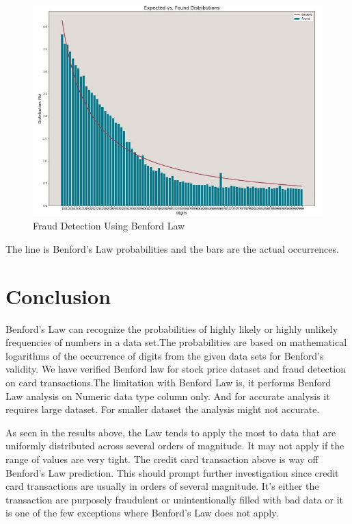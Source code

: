 \begin{figure}[!ht]
\centering\includegraphics[width=\columnwidth]{images/ben_card_trx.JPG}
  \caption{Fraud Detection Using Benford Law}\label{f:card-ds-benfordlaw}
\end{figure}

The line is Benford’s Law probabilities and the bars are 
the actual occurrences.


\section{Conclusion}
Benford’s Law can recognize the probabilities of highly  likely or 
highly unlikely frequencies of numbers in a data set.The 
probabilities are based on mathematical logarithms of the occurrence 
of digits from the given data sets for Benford's validity. We have 
verified Benford law for stock price dataset and fraud detection on 
card transactions.The limitation with Benford Law is, it performs 
Benford Law analysis on Numeric data type column only. 
And for accurate analysis it requires large dataset.
For smaller dataset the analysis might not accurate.

As seen in the results above, the Law tends to apply the most 
to data that are uniformly distributed across several orders of magnitude. 
It may not apply if the range of values are very tight. 
The credit card transaction above is way off Benford’s 
Law prediction. This should prompt further investigation 
since credit card transactions are usually in orders of several 
magnitude. It’s either the transaction are purposely fraudulent 
or unintentionally filled with bad data or it is one 
of the few exceptions where Benford’s Law does not apply.



 
